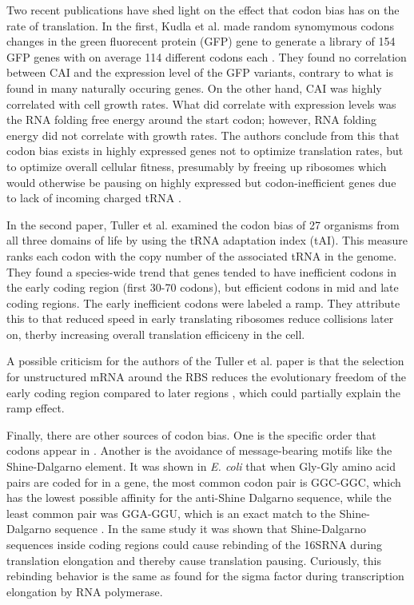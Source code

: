 Two recent publications have shed light on the effect that codon bias has on
the rate of translation. In the first, Kudla et al. made random synomymous
codons changes in the green fluorecent protein (GFP) gene to generate a
library of 154 GFP genes with on average 114 different codons each
\cite{kudla_coding-sequence_2009}. They found no correlation between CAI and
the expression level of the GFP variants, contrary to what is found in many
naturally occuring genes. On the other hand, CAI was highly correlated with
cell growth rates. What did correlate with expression levels was the RNA
folding free energy around the start codon; however, RNA folding energy did not
correlate with growth rates. The authors conclude from this that codon bias
exists in highly expressed genes not to optimize translation rates, but to
optimize overall cellular fitness, presumably by freeing up ribosomes which
would otherwise be pausing on highly expressed but codon-inefficient genes due
to lack of incoming charged tRNA \cite{kudla_coding-sequence_2009}.

In the second paper, Tuller et al. \cite{tuller_evolutionarily_2010} examined
the codon bias of 27 organisms from all three domains of life by using the tRNA
adaptation index (tAI). This measure ranks each codon with the copy number of
the associated tRNA in the genome. They found a species-wide trend that genes
tended to have inefficient codons in the early coding region (first 30-70 codons),
but efficient codons in mid and late coding regions. The early inefficient
codons were labeled a ramp. They attribute this to that reduced speed in early
translating ribosomes reduce collisions later on, therby increasing overall
translation efficiceny in the cell.

A possible criticism for the authors of the Tuller et al. paper is that the
selection for unstructured mRNA around the RBS reduces the evolutionary freedom
of the early coding region compared to later regions
\cite{plotkin_synonymous_2011}, which could partially explain the ramp effect.

Finally, there are other sources of codon bias. One is the specific order that
codons appear in \cite{cannarozzi_role_2010}. Another is the avoidance of
message-bearing motifs like the Shine-Dalgarno element. It was shown in
\textit{E. coli} that when Gly-Gly amino acid pairs are coded for in a gene,
the most common codon pair is GGC-GGC, which has the lowest possible affinity for
the anti-Shine Dalgarno sequence, while the least common pair was GGA-GGU,
which is an exact match to the Shine-Dalgarno sequence
\cite{li_anti-shine-dalgarno_2012}. In the same study it was shown that
Shine-Dalgarno sequences inside coding regions could cause rebinding of the
16SRNA during translation elongation and thereby cause translation pausing.
Curiously, this rebinding behavior is the same as found for the sigma factor
during transcription elongation by RNA polymerase.
